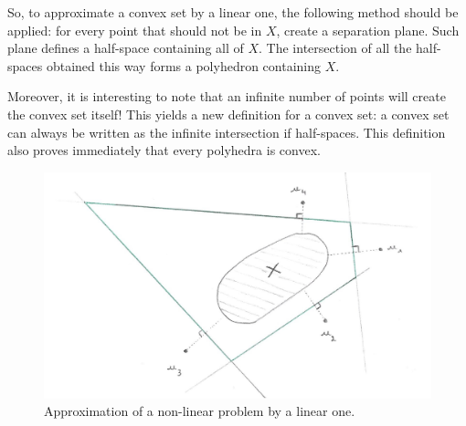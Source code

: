\documentclass[a4paper]{article}
\begin{document}
So, to approximate a convex set by a linear one, the following method should be applied: for every point that should not be in $X$, create a separation plane. Such plane defines a half-space containing all of $X$. The intersection of all the half-spaces obtained this way forms a polyhedron containing $X$.

Moreover, it is interesting to note that an infinite number of points will create the convex set itself! This yields a new definition for a convex set: a convex set can always be written as the infinite intersection if half-spaces. This definition also proves immediately that every polyhedra is convex.

\begin{figure}[H]
\centering
\includegraphics[scale=.4]{Scan}
\caption{Approximation of a non-linear problem by a linear one.}
\label{labello}
\end{figure}
\end{document}
